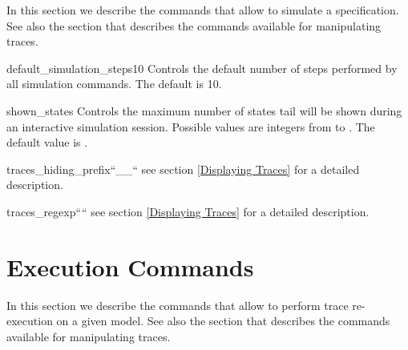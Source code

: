 In this section we describe the commands that allow to simulate a
\nusmv specification. See also the section  that
describes the commands available for manipulating traces.





\begin{nusmvVar} {default\_simulation\_steps}{}{10}
Controls the default number of steps performed by all simulation
commands. The default is 10.
\end{nusmvVar}

\begin{nusmvVar} {shown\_states}{}{}
Controls the  maximum number  of states tail  will be shown  during an
interactive simulation session. Possible values are integers from
 to . The default value is .
\end{nusmvVar}

\begin{nusmvVar} {traces\_hiding\_prefix}{}{``\_\_``}
see section \ref{Displaying Traces} for a detailed description.
\end{nusmvVar}

\begin{nusmvVar} {traces\_regexp}{}{````}
see section \ref{Displaying Traces} for a detailed description.
\end{nusmvVar}

\section{Execution Commands}
\label{Execution Commands}

In this section we describe the commands that allow to perform
trace re-execution on a given model. See also the section  that
describes the commands available for manipulating traces.




